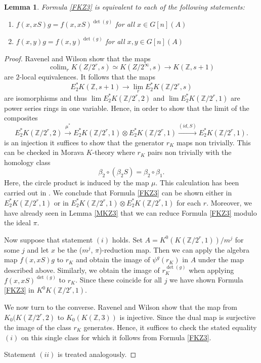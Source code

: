 \documentclass{amsart}
\DeclareMathOperator*{\colim}{colim}
\newcommand {\Z}{{\mathbb Z}}
\newcommand{\lra}{\longrightarrow}              %
\numberwithin{equation}{section}
\newtheorem{lemma}[thm]{Lemma}
\theoremstyle{definition}  %
\newtheorem{set theory}[thm]{Set Theoretic Prelude}
\begin{document}
\begin{lemma}\label{3equ}
Formula  \ref{FKZ3} is equivalent to each of the following statements:
\begin{enumerate}
\item $f(x,xS)g=f(x,x S)^{\det(g)}$ for all $x\in G[n](A)$ 
\item $f(x,y)g=f(x,y)^{\det(g)}$ for all $x,y\in G[n](A)$ 
\end{enumerate}
\end{lemma}
\begin{proof}
Ravenel and Wilson \cite{MR584466} show that the maps
$$ \colim_rK(Z/2^r, s)\simeq K(Z/2^\infty , s)\lra  K(\Z, s+1)$$
are $2$-local equivalences. It follows that the maps 
$$ E_2^* K(\Z,s+1) \lra \lim_r E_2^*K(\Z/2^r, s)$$
are isomorphisms and thus $\lim E_2^*K(\Z/2^r, 2) $ and 
$\lim  E_2^*K(\Z/2^r, 1)$ are power series rings in one variable.
Hence, in order to show that the limit of  the composites
$$ E_2^*K(\Z/2^r, 2) \stackrel{\mu^*}{\lra} E_2^*K(\Z/2^r, 1)\otimes E_2^*K(\Z/2^r, 1)
\stackrel{(id,S)}{\lra} E_2^*K(\Z/2^r, 1).$$
is an injection it suffices to show that the generator $r_K$ maps non trivially.  This can be checked in Morava $K$-theory where $r_K$ pairs non trivially with the homology class
$$\beta_2\circ (\beta_2 S)=\beta_2\circ \beta_1.$$
Here, the circle product is induced by the map $\mu$. This calculation has been carried out in \cite[p521ff]{MR3448393}. We conclude that Formula \ref{FKZ3} can be shown either in $E_2^*K(\Z/2^r, 1)$ or in $ E_2^*K(\Z/2^r, 1)\otimes E_2^*K(\Z/2^r, 1)$ for each $r$.
Moreover, we have already seen in Lemma \ref{MKZ3} that we can reduce Formula  \ref{FKZ3} modulo the ideal $\pi$.
\par
Now suppose  that  statement $(i)$ holds. Set $A=K^0(K(\Z/2^r,1))/m^j$ for some $j$ and let $x$ be the ($m^j$, $\pi$)-reduction map. Then we can apply the algebra map $f(x,xS)g$ to $r_K$ and obtain the image of $\psi^g(r_K)$ in $A$ under the map described above. Similarly, we obtain the image of $r_K^{\det(g)}$ when applying $f(x,xS)^{\det(g)}$ to $r_K$. Since these coincide for all $j$ we have shown Formula \ref{FKZ3} in $K^0K(\Z/2^r, 1)$. 
\par
We now turn to the converse. Ravenel and Wilson show that the map from  $K_0(K(\Z/2^r,2)$ to $K_0(K(\Z,3))$ is injective. Since the dual map is surjective the image of the class $r_K$ generates.  Hence, it suffices to check the stated equality $(i)$ on this single class for which it follows from Formula \ref{FKZ3}.
\par
Statement $(ii)$ is treated analogously.
 \end{proof}
\end{document}
